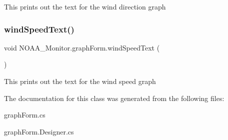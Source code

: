 This prints out the text for the wind direction graph \mbox{\label{class_n_o_a_a___monitor_1_1graph_form_a3bad905cbd2cc4f92c5198943d3e3339}} 
\subsubsection{\texorpdfstring{wind\+Speed\+Text()}{windSpeedText()}}
{\footnotesize\ttfamily void N\+O\+A\+A\+\_\+\+Monitor.\+graph\+Form.\+wind\+Speed\+Text (\begin{DoxyParamCaption}{ }\end{DoxyParamCaption})\hspace{0.3cm}{\ttfamily [inline]}}

This prints out the text for the wind speed graph 

The documentation for this class was generated from the following files\+:\begin{DoxyCompactItemize}
\item 
graph\+Form.\+cs\item 
graph\+Form.\+Designer.\+cs\end{DoxyCompactItemize}
